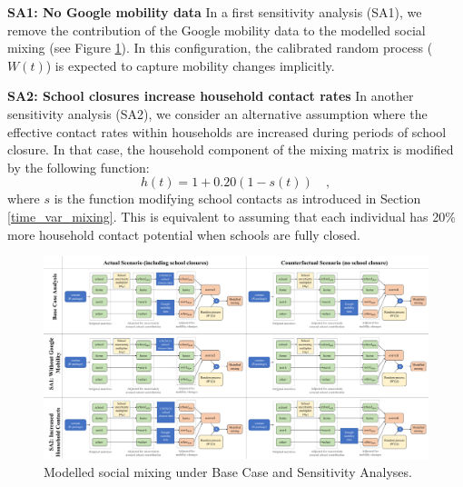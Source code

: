 \vspace{5pt}
\label{sa_descriptions}
\textbf{SA1: No Google mobility data}
In a first sensitivity analysis (SA1), we remove the contribution of the Google mobility data to the modelled social mixing (see Figure \ref{fig:mixing}). 
In this configuration, the calibrated random process ($W(t)$) is expected to capture mobility changes implicitly.

\vspace{5pt}
\textbf{SA2: School closures increase household contact rates}
In another sensitivity analysis (SA2), we consider an alternative assumption where the effective contact rates within households are increased during
periods of school closure. In that case, the household component of the mixing matrix is modified by the following function:
$$ h(t) = 1 + 0.20(1 - s(t)) \quad ,$$ 
where $s$ is the function modifying school contacts as introduced in Section \ref{time_var_mixing}. This is equivalent to assuming
that each individual has 20\% more household contact potential when schools are fully closed.


\begin{figure}[h]
  \begin{center}
  \includegraphics[width=1.0\textwidth]{../../tex_descriptions/projects/sm_covid/mixing_multi.pdf}
  \end{center}
  \caption{Modelled social mixing under Base Case and Sensitivity Analyses.
  } 
  \label{fig:mixing}
\end{figure}
